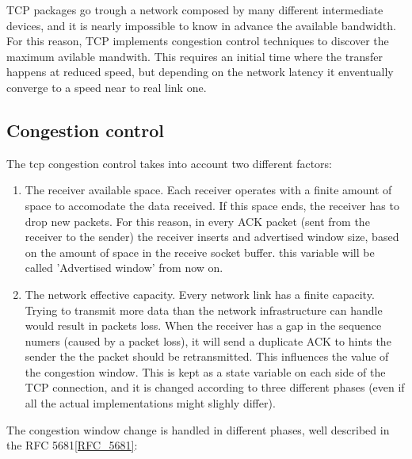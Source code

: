 \documentclass[a4paper,10pt]{article}
\begin{document}
TCP packages go trough a network composed by many different intermediate devices, and it is nearly impossible to know in advance the available bandwidth. For this reason, TCP implements congestion control techniques to discover the maximum avilable mandwith. This requires an initial time where the transfer happens at reduced speed, but depending on the network latency it enventually converge to a speed near to real link one.

\subsection{Congestion control}
The tcp congestion control takes into account two different factors: 
\begin{enumerate}
   \item The receiver available space. Each receiver operates with a finite
      amount of space to accomodate the data received. If this space ends, the
      receiver has to drop new packets. For this reason, in every ACK packet (sent from the receiver to the sender)
      the receiver inserts and advertised window size, based on the amount of
      space in the receive socket buffer. this variable will be called
      'Advertised window' from now on. 
   \item The network effective capacity. Every network link has a finite
      capacity. Trying to transmit more data than the network infrastructure
      can handle would result in packets loss. When the receiver has a gap in
      the sequence numers (caused by a packet loss), it will send a duplicate
      ACK to hints the sender the the packet should be retransmitted. This
      influences the value of the congestion window.  This is kept as a state variable on each side
      of the TCP connection, and it is changed according to three different
      phases (even if all the actual implementations might slighly differ).
\end{enumerate}
The congestion window change is handled in different phases, well described in the RFC 5681\ref{RFC_5681}:
\end{document}
